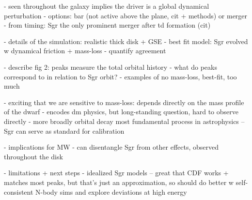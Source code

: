 \documentclass{natureprintstyle}
\begin{document}
- seen throughout the galaxy implies the driver is a global dynamical perturbation
- options: bar (not active above the plane, cit + methods) or merger
- from timing: Sgr the only prominent merger after td formation (cit)


- details of the simulation: realistic thick disk + GSE
- best fit model: Sgr evolved w dynamical friction + mass-loss
- quantify agreement

- describe fig 2: peaks measure the total orbital history
- what do peaks correspond to in relation to Sgr orbit?
- examples of no mass-loss, best-fit, too much

- exciting that we are sensitive to mass-loss: depends directly on the mass profile of the dwarf
- encodes dm physics, but long-standing question, hard to observe directly
- more broadly orbital decay most fundamental process in astrophysics -- Sgr can serve as standard for calibration

- implications for MW
- can disentangle Sgr from other effects, observed throughout the disk

- limitations + next steps
- idealized Sgr models -- great that CDF works + matches most peaks, but that's just an approximation, so should do better w self-consistent N-body sims and explore deviations at high energy



% 
{\small}
\end{document}
